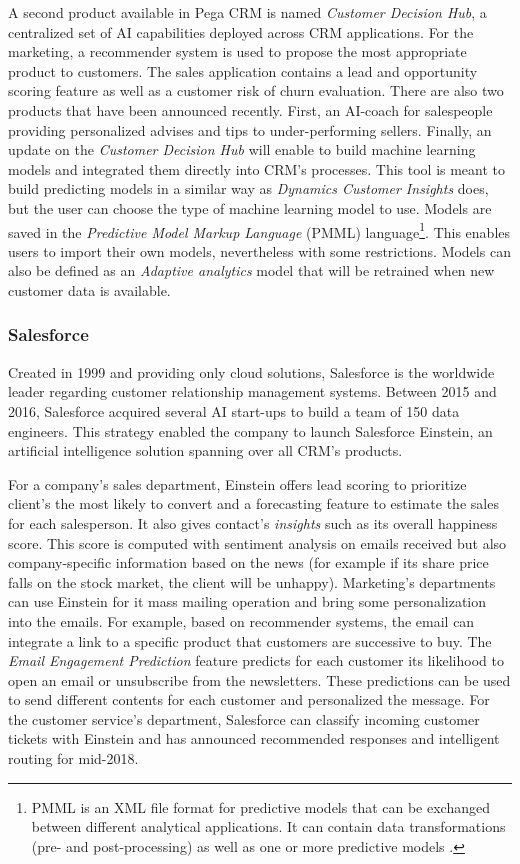 A second product available in Pega CRM is named \textit{Customer Decision Hub}, a centralized set of AI capabilities deployed across CRM applications. For the marketing, a recommender system is used to propose the most appropriate product to customers. The sales application contains a lead and opportunity scoring feature as well as a customer risk of churn evaluation. There are also two products that have been announced recently. First, an AI-coach for salespeople providing personalized advises and tips to under-performing sellers. Finally, an update on the \textit{Customer Decision Hub} will enable to build machine learning models and integrated them directly into CRM's processes. This tool is meant to build predicting models in a similar way as \textit{Dynamics Customer Insights} does, but the user can choose the type of machine learning model to use. Models are saved in the \textit{Predictive Model Markup Language} (PMML) language\footnote{PMML is an XML file format for predictive models that can be exchanged between different analytical applications. It can contain data transformations (pre- and post-processing) as well as one or more predictive models \cite{pmml}.}. This enables users to import their own models, nevertheless with some restrictions. Models can also be defined as an \textit{Adaptive analytics} model that will be retrained when new customer data is available.

\subsubsection*{Salesforce}
Created in 1999 and providing only cloud solutions, Salesforce is the worldwide leader regarding customer relationship management systems. Between 2015 and 2016, Salesforce acquired several AI start-ups to build a team of 150 data engineers. This strategy enabled the company to launch Salesforce Einstein, an artificial intelligence solution spanning over all CRM's products.

For a company's sales department, Einstein offers lead scoring to prioritize client's the most likely to convert and a forecasting feature to estimate the sales for each salesperson. It also gives contact's \textit{insights} such as its overall happiness score. This score is computed with sentiment analysis on emails received but also company-specific information based on the news (for example if its share price falls on the stock market, the client will be unhappy). Marketing's departments can use Einstein for it mass mailing operation and bring some personalization into the emails. For example, based on recommender systems, the email can integrate a link to a specific product that customers are successive to buy. The \textit{Email Engagement Prediction} feature predicts for each customer its likelihood to open an email or unsubscribe from the newsletters. These predictions can be used to send different contents for each customer and personalized the message. For the customer service's department, Salesforce can classify incoming customer tickets with Einstein and has announced recommended responses and intelligent routing for mid-2018.

